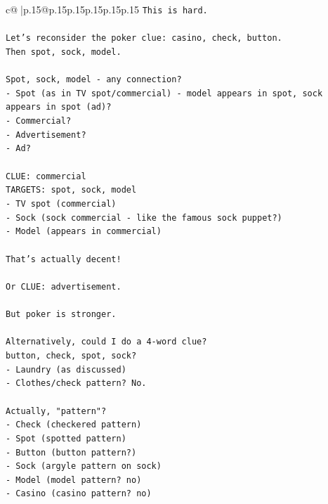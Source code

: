 \documentclass{article}
\begin{document}
{\begin{supertabular}{c@{$\;$}|p{.15\linewidth}@{}p{.15\linewidth}p{.15\linewidth}p{.15\linewidth}p{.15\linewidth}p{.15\linewidth}}
{{{\texttt{This is hard.} \\
\\ 
\texttt{Let's reconsider the poker clue: casino, check, button.} \\
\texttt{Then spot, sock, model.} \\
\\ 
\texttt{Spot, sock, model {-} any connection?} \\
\texttt{{-} Spot (as in TV spot/commercial) {-} model appears in spot, sock appears in spot (ad)?} \\
\texttt{{-} Commercial?} \\
\texttt{{-} Advertisement?} \\
\texttt{{-} Ad?} \\
\\ 
\texttt{CLUE: commercial} \\
\texttt{TARGETS: spot, sock, model} \\
\texttt{{-} TV spot (commercial)} \\
\texttt{{-} Sock (sock commercial {-} like the famous sock puppet?)} \\
\texttt{{-} Model (appears in commercial)} \\
\\ 
\texttt{That's actually decent!} \\
\\ 
\texttt{Or CLUE: advertisement.} \\
\\ 
\texttt{But poker is stronger.} \\
\\ 
\texttt{Alternatively, could I do a 4{-}word clue?} \\
\texttt{button, check, spot, sock?} \\
\texttt{{-} Laundry (as discussed)} \\
\texttt{{-} Clothes/check pattern? No.} \\
\\ 
\texttt{Actually, "pattern"?} \\
\texttt{{-} Check (checkered pattern)} \\
\texttt{{-} Spot (spotted pattern)} \\
\texttt{{-} Button (button pattern?)} \\
\texttt{{-} Sock (argyle pattern on sock)} \\
\texttt{{-} Model (model pattern? no)} \\
\texttt{{-} Casino (casino pattern? no)} \\
\\ 
}}}
\end{supertabular}}
\end{document}
